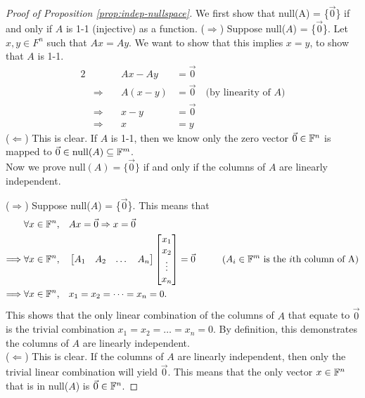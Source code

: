 \begin{proof}[Proof of Proposition \ref{prop:indep-nullspace}] We first show that null(A) = \{$\vec{0}$\} if and only if $A$ is 1-1 (injective) as a function.
($\Longrightarrow$) Suppose null($A$) = \{$\vec{0}$\}. Let $x,y \in F^n$ such that $Ax = Ay$. We want to show that this implies $x = y$, to show that $A$ is 1-1.
\begin{alignat*}{2}
    && Ax - Ay &= \vec{0} \\
    &\Longrightarrow \quad & A(x - y) &= \vec{0} \quad \text{(by linearity of $A$)} \\
    &\Longrightarrow \quad & x - y &= \vec{0} \\
    &\Longrightarrow \quad & x &= y
\end{alignat*}
($\Longleftarrow$) This is clear. If $A$ is 1-1, then we know only the zero vector $\vec{0} \in \mathbb F^n$ is mapped to $\vec{0} \in \text{null}(A) \subseteq \mathbb F^m$. \\

\noindent Now we prove $\text{null}(A) = \{\vec{0}\}$ if and only if the columns of $A$ are linearly independent.

\noindent ($\Longrightarrow$) Suppose null($A$) = \{$\vec{0}$\}. This means that
\begin{align*}
    \forall x \in \mathbb F^n, &\quad Ax = \vec{0} \Rightarrow x = \vec{0} \\
    \Longrightarrow \forall x \in \mathbb F^n, &\quad \begin{bmatrix}A_1 & A_2 & \dots & A_n\end{bmatrix}
    \begin{bmatrix}x_1 \\ x_2 \\ \vdots \\ x_n\end{bmatrix} = \vec{0} \hspace{1cm} (\text{$A_i \in \mathbb F^m$ is the $i$th column of A}) \\
    \Longrightarrow \forall x \in \mathbb F^n, &\quad x_1 = x_2 = \dots = x_n = 0.
\end{align*}
This shows that the only linear combination of the columns of $A$ that equate to $\vec{0}$ is the trivial combination $x_1 = x_2 = \dots = x_n = 0$. By definition, this demonstrates the columns of $A$ are linearly independent. \\

\noindent ($\Longleftarrow$) This is clear. If the columns of $A$ are linearly independent, then only the trivial linear combination will yield $\vec{0}$. This means that the only vector $x \in \mathbb F^n$ that is in null($A$) is $\vec{0} \in \mathbb F^n$.
\end{proof}


